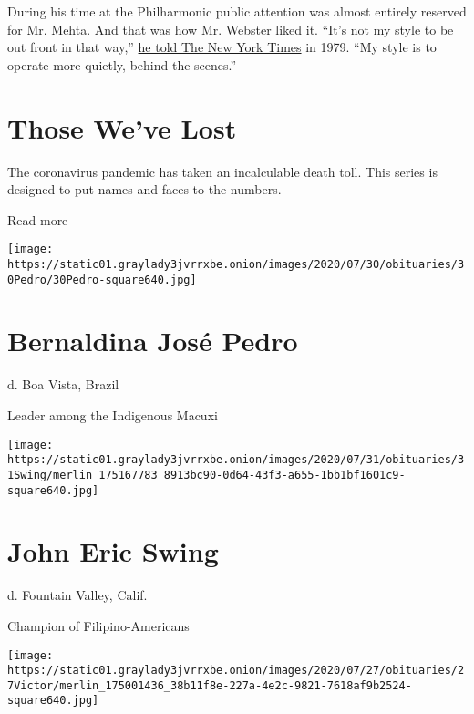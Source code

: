 During his time at the Philharmonic public attention was almost entirely
reserved for Mr. Mehta. And that was how Mr. Webster liked it. ``It's
not my style to be out front in that way,''
\href{https://timesmachine.nytimes3xbfgragh.onion/timesmachine/1979/09/09/111195056.pdf?pdf_redirect=true\&ip=0}{he
told The New York Times} in 1979. ``My style is to operate more quietly,
behind the scenes.''

\href{https://www.nytimes3xbfgragh.onion/interactive/2020/obituaries/people-died-coronavirus-obituaries.html?action=click\&pgtype=Article\&state=default\&region=BELOW_MAIN_CONTENT\&context=covid_obits_promo}{}

\hypertarget{those-weve-lost}{%
\section{Those We've Lost}\label{those-weve-lost}}

The coronavirus pandemic has taken an incalculable death toll. This
series is designed to put names and faces to the numbers.

Read more

\texttt{[image: https://static01.graylady3jvrrxbe.onion/images/2020/07/30/obituaries/30Pedro/30Pedro-square640.jpg]}

\hypertarget{bernaldina-josuxe9-pedro}{%
\section{Bernaldina José Pedro}\label{bernaldina-josuxe9-pedro}}

d. Boa Vista, Brazil

Leader among the Indigenous Macuxi

\texttt{[image: https://static01.graylady3jvrrxbe.onion/images/2020/07/31/obituaries/31Swing/merlin\_175167783\_8913bc90-0d64-43f3-a655-1bb1bf1601c9-square640.jpg]}

\hypertarget{john-eric-swing}{%
\section{John Eric Swing}\label{john-eric-swing}}

d. Fountain Valley, Calif.

Champion of Filipino-Americans

\texttt{[image: https://static01.graylady3jvrrxbe.onion/images/2020/07/27/obituaries/27Victor/merlin\_175001436\_38b11f8e-227a-4e2c-9821-7618af9b2524-square640.jpg]}

